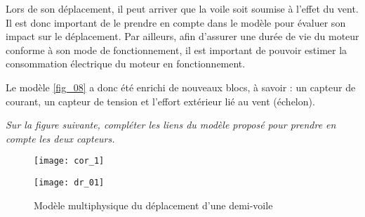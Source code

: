 %

Lors de son déplacement, il peut arriver que la voile soit soumise à l’effet du vent. Il est donc important de
le prendre en compte dans le modèle pour évaluer son impact sur le déplacement. Par ailleurs, afin d’assurer
une durée de vie du moteur conforme à son mode de fonctionnement, il est important de pouvoir estimer la
consommation électrique du moteur en fonctionnement.

Le modèle \autoref{fig_08} a donc été enrichi de nouveaux blocs, à savoir : un capteur de courant, un capteur de tension
et l’effort extérieur lié au vent (échelon).
\fi


\question{\label{q5}}\textit{Sur la figure suivante, compléter les liens du modèle proposé pour prendre en compte
les deux capteurs.}
\ifprof
\begin{corrige}
\begin{figure}[H]
\centering
\texttt{[image: cor\_1]}
\end{figure}
\end{corrige}
\else
\fi





\ifprof
\else
\begin{figure}[H]
\centering
\texttt{[image: dr\_01]}
\caption{Modèle multiphysique du déplacement d’une demi-voile \label{dr_01}}
\end{figure}

\fi
